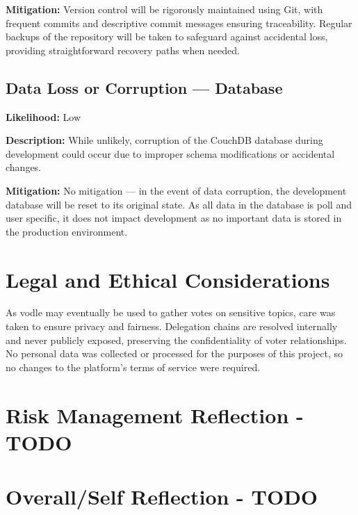 \textbf{Mitigation:} Version control will be rigorously maintained using Git, with frequent commits and descriptive commit messages ensuring traceability. Regular backups of the repository will be taken to safeguard against accidental loss, providing straightforward recovery paths when needed.

\subsection*{Data Loss or Corruption --- Database}

\textbf{Likelihood:} Low

\textbf{Description:} While unlikely, corruption of the CouchDB database during development could occur due to improper schema modifications or accidental changes.

\textbf{Mitigation:} No mitigation --- in the event of data corruption, the development database will be reset to its original state. As all data in the database is poll and user specific, it does not impact development as no important data is stored in the production environment.

\section{Legal and Ethical Considerations}

As vodle may eventually be used to gather votes on sensitive topics, care was taken to ensure privacy and fairness. Delegation chains are resolved internally and never publicly exposed, preserving the confidentiality of voter relationships. No personal data was collected or processed for the purposes of this project, so no changes to the platform's terms of service were required.

\section{Risk Management Reflection - TODO}

\section{Overall/Self Reflection - TODO}
